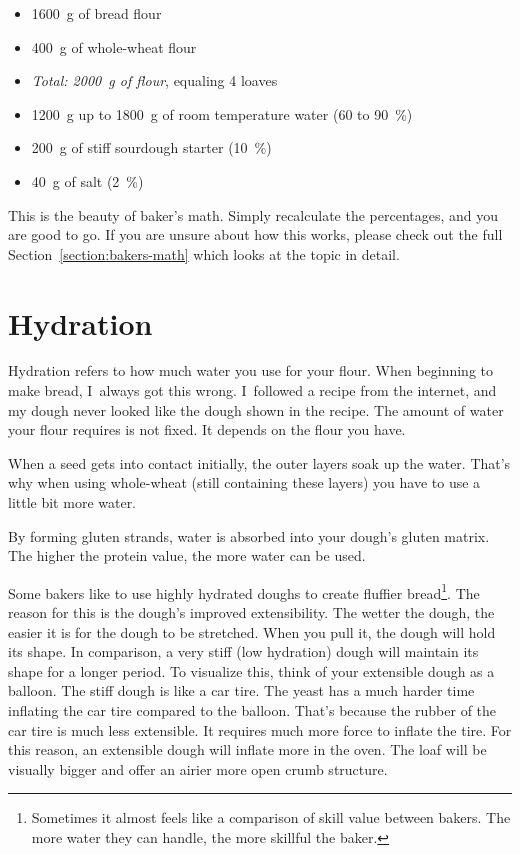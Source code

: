 \begin{itemize}
  \item \qty{1600}{\gram} of bread flour
  \item \qty{400}{\gram} of whole-wheat flour
  \item \emph{Total: 2000~g of flour}, equaling 4 loaves
  \item \qty{1200}{\gram} up to \qty{1800}{\gram} of room temperature water (60 to \qty{90}{\percent})
  \item \qty{200}{\gram} of stiff sourdough starter (\qty{10}{\percent})
  \item \qty{40}{\gram} of salt (\qty{2}{\percent})
\end{itemize}

This is the beauty of baker's math. Simply recalculate the percentages, and you
are good to go. If you are unsure about how this works, please check out the
full Section~\ref{section:bakers-math} which looks at the topic in detail.

\section{Hydration}

Hydration refers to how much water you use for your flour. When
beginning to make bread, I~always got this wrong. I~followed a recipe from the
internet, and my dough never looked like the dough shown in the recipe.
The amount of water your flour requires is not fixed. It depends on the flour
you have.

When a seed gets into contact initially, the outer layers soak up the water.
That's why when using whole-wheat (still containing these layers) you have to
use a little bit more water.

By forming gluten strands, water is absorbed into your dough's gluten matrix. The higher the
protein value, the more water can be used.

Some bakers like to use highly hydrated doughs to create fluffier
bread\footnote{Sometimes it almost feels like a comparison of skill value
between bakers. The more water they can handle, the more skillful the baker.}.
The reason for this
is the dough's improved extensibility. The wetter the dough, the easier it is
for the dough to be stretched. When you pull it, the dough will hold its
shape. In comparison, a very stiff (low hydration) dough will maintain its
shape for a longer period. To visualize this, think of your extensible
dough as a balloon. The stiff dough is like a car tire.
The yeast has a much harder time inflating the car tire compared to the balloon.
That’s because the rubber of the car tire is much less extensible.
It requires much more force to inflate the tire. For this reason,
an extensible dough will inflate more in the oven. The loaf will
be visually bigger and offer an airier more open crumb structure.

